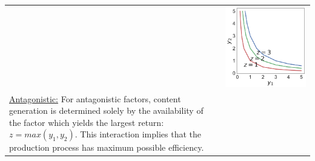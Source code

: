 \begin{table}[h!]
\begin{tabular}{m{}c}
    &
    \begin{minipage}{.17\textwidth}
      \includegraphics[width=\textwidth, height=.975\textwidth]{Figures/Interactive_Essential.pdf}
    \end{minipage}
    \\
    \vspace{-5pt}
    \uline{Antagonistic:} For antagonistic factors, content generation is determined solely by the availability of the factor which yields the largest return: $z = max(y_1, y_2)$. This interaction implies that the production process has maximum possible efficiency. 
    &
    \begin{minipage}{.17\textwidth}

\end{minipage}
\end{tabular}
\end{table}
